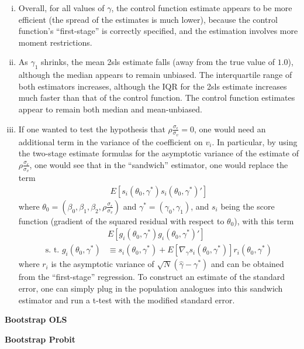 \documentclass[11pt]{article}
\begin{document}
\begin{enumerate}[(a)]
	\begin{enumerate}[(i)]
	 
		\item Overall, for all values of $\gamma$, the control function estimate appears to be more efficient (the spread of the estimates is much lower), because the control function's ``first-stage'' is correctly specified, and the estimation involves more moment restrictions.
		
		\item As $\gamma_1$ shrinks, the mean 2sls estimate falls (away from the true value of $1.0$), although the median appears to remain unbiased. The interquartile range of both estimators increases, although the IQR for the 2sls estimate increases much faster than that of the control function. The control function estimates appear to remain both median and mean-unbiased.

		\item If one wanted to test the hypothesis that $\rho \frac{\sigma_{\epsilon}}{\sigma_{v}} = 0$, one would need an additional term in the variance of the coefficient on $v_i$. In particular, by using the two-stage estimate formulas for the asymptotic variance of the estimate of $\rho \frac{\sigma_{\epsilon}}{\sigma_{v}}$, one would see that in the ``sandwich'' estimator, one would replace the term
		\begin{align*}
			E[s_i(\theta_0, \gamma^*)s_i(\theta_0, \gamma^*)']
		\end{align*}
		where $\theta_0 = (\beta_0, \beta_1, \beta_2, \rho \frac{\sigma_{\epsilon}}{\sigma_{v}})$ and $\gamma^* = (\gamma_0, \gamma_1)$, and $s_i$ being the score function (gradient of the squared residual with respect to $\theta_0$), with this term
		\begin{align*}
			& E[g_i(\theta_0, \gamma^*)g_i(\theta_0, \gamma^*)'] \\
			\mbox{s. t. } g_i(\theta_0, \gamma^*) &\equiv s_i(\theta_0, \gamma^*) + E \left[ \nabla_\gamma s_i(\theta_0, \gamma^*) \right]  r_i (\theta_0, \gamma^*)
		\end{align*}
		where $r_i$ is the asymptotic variance of $\sqrt{N}(\hat{\gamma} - \gamma^*)$ and can be obtained from the ``first-stage'' regression. To construct an estimate of the standard error, one can simply plug in the population analogues into this sandwich estimator and run a t-test with the modified standard error.

	\end{enumerate}

	\centering
	

\end{enumerate}

\bigskip \textbf{Bootstrap OLS}

\bigskip \textbf{Bootstrap Probit}
\end{document}
